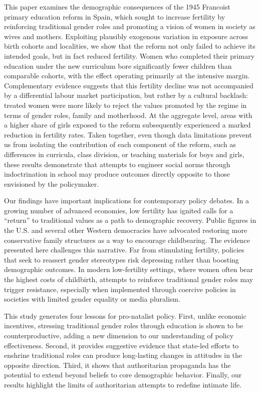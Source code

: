 \documentclass[a4paper,oneside,final,onecolumn,12pt,english]{article}
\begin{document}
This paper examines the demographic consequences of the 1945 Francoist primary education reform in Spain, which sought to increase fertility by reinforcing traditional gender roles and promoting a vision of women in society as wives and mothers. Exploiting plausibly exogenous variation in exposure across birth cohorts and localities, we show that the reform not only failed to achieve its intended goals, but in fact reduced fertility. Women who completed their primary education under the new curriculum bore significantly fewer children than comparable cohorts, with the effect operating primarily at the intensive margin. Complementary evidence suggests that this fertility decline was not accompanied by a differential labour market participation, but rather by a cultural backlash: treated women were more likely to reject the values promoted by the regime in terms of gender roles, family and motherhood. At the aggregate level, areas with a higher share of girls exposed to the reform subsequently experienced a marked reduction in fertility rates. Taken together, even though data limitations prevent us from isolating the contribution of each component of the reform, such as differences in curricula, class division, or teaching materials for boys and girls, these results demonstrate that attempts to engineer social norms through indoctrination in school may produce outcomes directly opposite to those envisioned by the policymaker.

Our findings have important implications for contemporary policy debates. In a growing number of advanced economies, low fertility has ignited calls for a “return” to traditional values as a path to demographic recovery. Public figures in the U.S. and several other Western democracies have advocated restoring more conservative family structures as a way to encourage childbearing. The evidence presented here challenges this narrative. Far from stimulating fertility, policies that seek to reassert gender stereotypes risk depressing rather than boosting demographic outcomes. In modern low-fertility settings, where women often bear the highest costs of childbirth, attempts to reinforce traditional gender roles may trigger resistance, especially when implemented through coercive policies in societies with limited gender equality or media pluralism.%

This study generates four lessons for pro-natalist policy. First, unlike economic incentives, stressing traditional gender roles through education is shown to be counterproductive, adding a new dimension to our understanding of policy effectiveness. Second, it provides suggestive evidence that state-led efforts to enshrine traditional roles can produce long-lasting changes in attitudes in the opposite direction. Third, it shows that  authoritarian propaganda has the potential to extend beyond beliefs to core demographic behavior. Finally, our results highlight the limits of authoritarian attempts to redefine intimate life.
\end{document}

